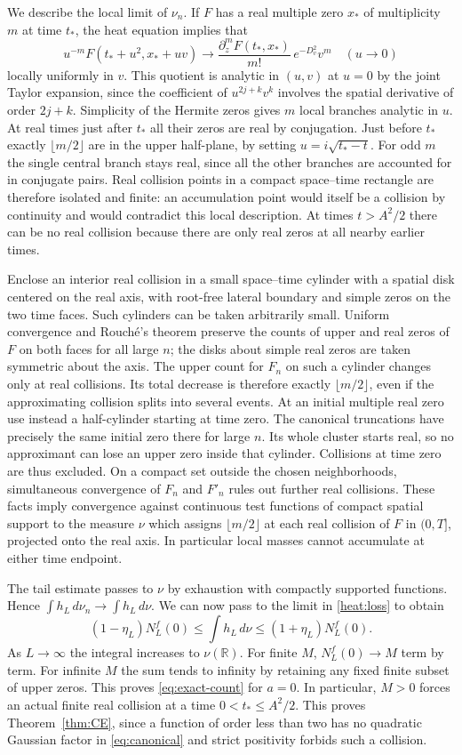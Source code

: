 \documentclass[11pt,a4paper]{article}
\numberwithin{equation}{section}
\begin{document}
We describe the local limit of $\nu_n$. If $F$ has a real multiple
zero $x_*$ of multiplicity $m$ at time $t_*$, the heat equation
implies that
\[
 u^{-m}F(t_*+u^2,x_*+u v)
       \longrightarrow
       \frac{\partial_z^mF(t_*,x_*)}{m!}\,e^{-D_v^2}v^m
       \quad(u\to0)
\]
locally uniformly in $v$. This quotient is analytic in $(u,v)$ at
$u=0$ by the joint Taylor expansion, since the coefficient of
$u^{2j+k}v^k$ involves the spatial derivative of order $2j+k$.
Simplicity of the Hermite zeros gives $m$ local branches analytic
in $u$. At real times just after $t_*$ all their zeros are real
by conjugation. Just before $t_*$ exactly $\lfloor m/2\rfloor$ are
in the upper half-plane, by setting $u=i\sqrt{t_*-t}$. For odd $m$
the single central branch stays real, since all the other branches
are accounted for in conjugate pairs. Real collision points in
a compact space--time rectangle are therefore isolated and finite:
an accumulation point would itself be a collision by continuity and
would contradict this local description. At times $t>A^2/2$ there
can be no real collision because there are only real zeros at all
nearby earlier times.

Enclose an interior real collision in a small space--time cylinder with
a spatial disk centered on the real axis, with root-free lateral
boundary and simple zeros on the two time faces. Such cylinders
can be taken arbitrarily small. Uniform convergence and Rouch\'e's
theorem preserve the counts of upper and real zeros of $F$ on both
faces for all large $n$; the disks about simple real zeros are taken
symmetric about the axis. The upper count for $F_n$ on such a
cylinder changes only at real collisions. Its total decrease is
therefore exactly $\lfloor m/2\rfloor$, even if the approximating
collision splits into several events. At an initial multiple real
zero use instead a half-cylinder starting at time zero. The
canonical truncations have precisely the same initial zero there
for large $n$. Its whole cluster starts real, so no approximant
can lose an upper zero inside that cylinder. Collisions at time zero
are thus excluded. On a compact set outside the chosen
neighborhoods, simultaneous convergence of $F_n$ and $F'_n$ rules
out further real collisions. These facts imply convergence against
continuous test functions of compact spatial support to the measure
$\nu$ which assigns $\lfloor m/2\rfloor$ at each real collision of
$F$ in $(0,T]$, projected onto the real axis. In particular local
masses cannot accumulate at either time endpoint.

The tail estimate passes to $\nu$ by exhaustion with compactly
supported functions. Hence $\int h_L\,d\nu_n\to\int h_L\,d\nu$.
We can now pass to the limit in \eqref{heat:loss} to obtain
\[
 (1-\eta_L)N_L^f(0)\le \int h_L\,d\nu\le(1+\eta_L)N_L^f(0).
\]
As $L\to\infty$ the integral increases to $\nu(\mathbb R)$.
For finite $M$, $N_L^f(0)\to M$ term by term. For infinite $M$
the sum tends to infinity by retaining any fixed finite subset of
upper zeros. This proves \eqref{eq:exact-count} for $a=0$.
In particular, $M>0$ forces an actual finite real collision at a
time $0<t_*\le A^2/2$. This proves Theorem~\ref{thm:CE}, since a function of order
less than two has no quadratic Gaussian factor in
\eqref{eq:canonical} and strict positivity forbids such a collision.
\end{document}
